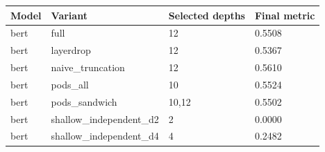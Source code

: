 \begin{tabular}{llll}
\hline
Model & Variant & Selected depths & Final metric \\
\hline
bert & full & 12 & 0.5508 \\
bert & layerdrop & 12 & 0.5367 \\
bert & naive\_truncation & 12 & 0.5610 \\
bert & pods\_all & 10 & 0.5524 \\
bert & pods\_sandwich & 10,12 & 0.5502 \\
bert & shallow\_independent\_d2 & 2 & 0.0000 \\
bert & shallow\_independent\_d4 & 4 & 0.2482 \\
\hline
\end{tabular}
